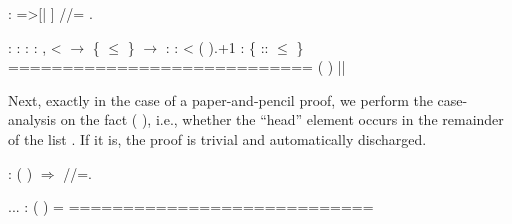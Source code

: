 \begin{coqdoccode}
\coqdocemptyline
\coqdocnoindent
{}:  =>[|  ]  //=  .\coqdoceol
\coqdocemptyline
\end{coqdoccode}
\coqdoceol
\coqdocemptyline
\coqdocindent{1.00em}
 : \coqdoceol
\coqdocindent{1.00em}
 :  \coqdoceol
\coqdocindent{1.00em}
 : \coqdockw{\ensuremath{\forall}}  :  ,\coqdoceol
\coqdocindent{3.50em}
  <   \ensuremath{\rightarrow} \{  \ensuremath{\le} \} \ensuremath{\rightarrow}  \coqdoceol
\coqdocindent{1.00em}
 :  \coqdoceol
\coqdocindent{1.00em}
 :   < ( ).+1\coqdoceol
\coqdocindent{1.00em}
 : \{  ::  \ensuremath{\le} \}\coqdoceol
\coqdocindent{1.00em}
============================\coqdoceol
\coqdocindent{1.50em}
(  ) ||  

\coqdocemptyline


Next, exactly in the case of a paper-and-pencil proof, we perform the
case-analysis on the fact (  ), i.e., whether the ``head''
element  occurs in the remainder of the list . If it is,
the proof is trivial and automatically discharged.


\begin{coqdoccode}
\coqdocemptyline
\coqdocnoindent
{} : (  ) \ensuremath{\Rightarrow} //=.\coqdoceol
\end{coqdoccode}
\coqdoceol
\coqdocemptyline
\coqdocindent{1.00em}
...\coqdoceol
\coqdocindent{1.00em}
 : (  ) = \coqdoceol
\coqdocindent{1.00em}
============================\coqdoceol
\coqdocindent{1.50em}
 

